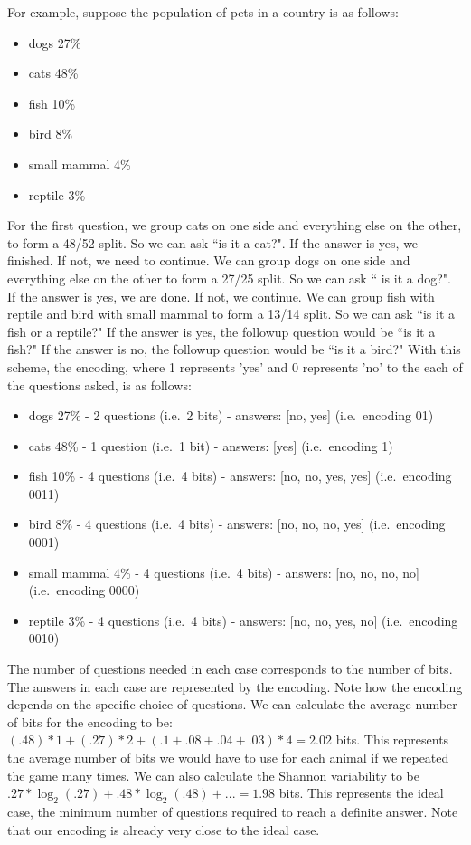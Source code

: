 \documentclass{article}
\begin{document}
For example, suppose the population of pets in a country is as follows:
\begin{itemize}
\item dogs 27\%
\item cats 48\%
\item fish 10\%
\item bird 8\%
\item small mammal 4\%
\item reptile 3\%
\end{itemize}
For the first question, we group cats on one side and everything else on the other, to form a 48/52 split. So we can ask ``is it a cat?". If the answer is yes, we finished. If not, we need to continue. We can group dogs on one side and everything else on the other to form a 27/25 split. So we can ask `` is it a dog?". If the answer is yes, we are done. If not, we continue. We can group fish with reptile and bird with small mammal to form a 13/14 split. So we can ask ``is it a fish or a reptile?" If the answer is yes, the followup question would be ``is it a fish?" If the answer is no, the followup question would be ``is it a bird?" With this scheme, the encoding, where 1 represents 'yes' and 0 represents 'no' to the each of the questions asked, is as follows:
\begin{itemize}
\item dogs 27\% - 2 questions (i.e.~2 bits) - answers: [no, yes] (i.e.~encoding 01)
\item cats 48\% - 1 question (i.e.~1 bit) - answers: [yes] (i.e.~encoding 1)
\item fish 10\% - 4 questions (i.e.~4 bits) - answers: [no, no, yes, yes] (i.e.~encoding 0011)
\item bird 8\% - 4 questions (i.e.~4 bits) - answers: [no, no, no, yes] (i.e.~encoding 0001)
\item small mammal 4\% - 4 questions (i.e.~4 bits) - answers: [no, no, no, no] (i.e.~encoding 0000)
\item reptile 3\% - 4 questions (i.e.~4 bits) - answers: [no, no, yes, no] (i.e.~encoding 0010)
\end{itemize}
The number of questions needed in each case corresponds to the number of bits. The answers in each case are represented by the encoding. Note how the encoding depends on the specific choice of questions. We can calculate the average number of bits for the encoding to be:  $(.48) * 1 + (.27) * 2 + (.1 + .08 + .04 + .03) * 4 = 2.02$ bits. This represents the average number of bits we would have to use for each animal if we repeated the game many times. We can also calculate the Shannon variability to be $.27 * \log_2(.27) + .48 * \log_2 (.48) + ... =1.98$ bits. This represents the ideal case, the minimum number of questions required to reach a definite answer. Note that our encoding is already very close to the ideal case.
\end{document}
